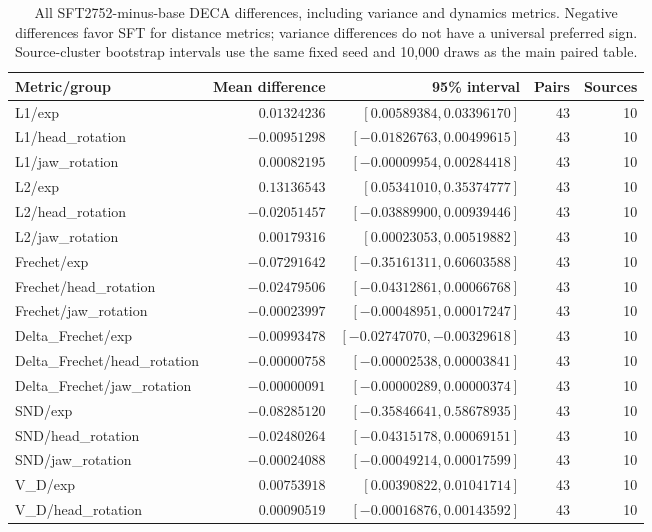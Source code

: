 \begin{table}[t]
\centering\small
\caption{All SFT2752-minus-base DECA differences, including variance and dynamics metrics. Negative differences favor SFT for distance metrics; variance differences do not have a universal preferred sign. Source-cluster bootstrap intervals use the same fixed seed and 10,000 draws as the main paired table.}
\label{tab:vico43-paired-complete}
\setlength{\tabcolsep}{4pt}
\begin{tabular}{lrrrr}
\toprule
Metric/group & Mean difference & 95\% interval & Pairs & Sources \\
\midrule
L1/exp & $0.01324236$ & $[0.00589384, 0.03396170]$ & 43 & 10 \\
L1/head\_rotation & $-0.00951298$ & $[-0.01826763, 0.00499615]$ & 43 & 10 \\
L1/jaw\_rotation & $0.00082195$ & $[-0.00009954, 0.00284418]$ & 43 & 10 \\
L2/exp & $0.13136543$ & $[0.05341010, 0.35374777]$ & 43 & 10 \\
L2/head\_rotation & $-0.02051457$ & $[-0.03889900, 0.00939446]$ & 43 & 10 \\
L2/jaw\_rotation & $0.00179316$ & $[0.00023053, 0.00519882]$ & 43 & 10 \\
Frechet/exp & $-0.07291642$ & $[-0.35161311, 0.60603588]$ & 43 & 10 \\
Frechet/head\_rotation & $-0.02479506$ & $[-0.04312861, 0.00066768]$ & 43 & 10 \\
Frechet/jaw\_rotation & $-0.00023997$ & $[-0.00048951, 0.00017247]$ & 43 & 10 \\
Delta\_Frechet/exp & $-0.00993478$ & $[-0.02747070, -0.00329618]$ & 43 & 10 \\
Delta\_Frechet/head\_rotation & $-0.00000758$ & $[-0.00002538, 0.00003841]$ & 43 & 10 \\
Delta\_Frechet/jaw\_rotation & $-0.00000091$ & $[-0.00000289, 0.00000374]$ & 43 & 10 \\
SND/exp & $-0.08285120$ & $[-0.35846641, 0.58678935]$ & 43 & 10 \\
SND/head\_rotation & $-0.02480264$ & $[-0.04315178, 0.00069151]$ & 43 & 10 \\
SND/jaw\_rotation & $-0.00024088$ & $[-0.00049214, 0.00017599]$ & 43 & 10 \\
V\_D/exp & $0.00753918$ & $[0.00390822, 0.01041714]$ & 43 & 10 \\
V\_D/head\_rotation & $0.00090519$ & $[-0.00016876, 0.00143592]$ & 43 & 10 \\

\end{tabular}
\end{table}
